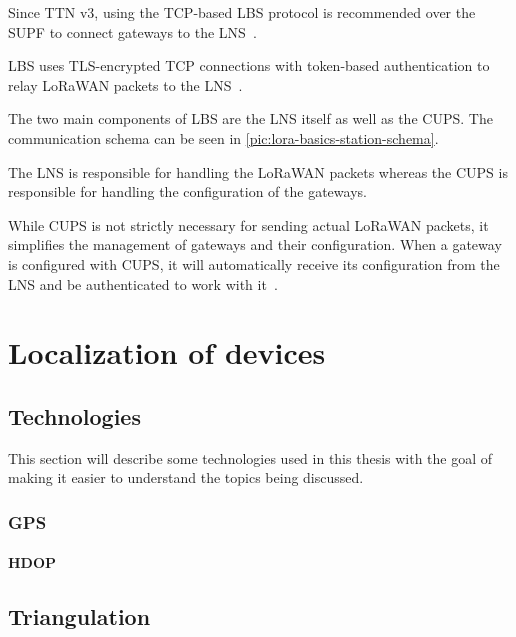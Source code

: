 Since \ac{TTN} v3, using the \ac{TCP}-based \acl{LBS} protocol is recommended over the \ac{SUPF} to connect gateways to the \ac{LNS}~\cite{the_things_industries_bv_semtech_2022}.

\ac{LBS} uses \ac{TLS}-encrypted \ac{TCP} connections with token-based authentication to relay \ac{LoRaWAN} packets to the \ac{LNS}~\cite{the_things_industries_bv_lora_2022}.

The two main components of \acl{LBS} are the \ac{LNS} itself as well as the \acf{CUPS}.
The communication schema can be seen in \cref{pic:lora-basics-station-schema}.

The \ac{LNS} is responsible for handling the \ac{LoRaWAN} packets whereas the \acl{CUPS} is responsible for handling the configuration of the gateways.

While \ac{CUPS} is not strictly necessary for sending actual \ac{LoRaWAN} packets, it simplifies the management of gateways and their configuration.
When a gateway is configured with \ac{CUPS}, it will automatically receive its configuration from the \ac{LNS} and be authenticated to work with it~\cite{the_things_industries_bv_lora_2022}.

\section{Localization of devices}

\subsection{Technologies}

This section will describe some technologies used in this thesis with the goal of making it easier to understand the topics being discussed.

\subsubsection{\ac{GPS}}


\paragraph{\ac{HDOP}}

\subsection{Triangulation}


